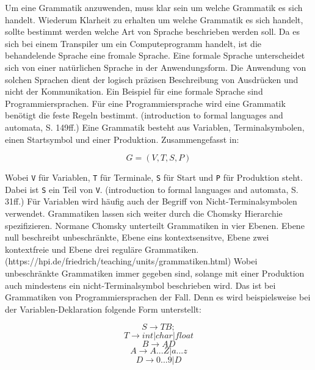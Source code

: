 Um eine Grammatik anzuwenden, muss klar sein um welche Grammatik es sich handelt. Wiederum Klarheit zu erhalten um welche Grammatik es sich handelt, sollte bestimmt werden welche Art von Sprache beschrieben werden soll. Da es sich bei einem Transpiler um ein Computeprogramm handelt, ist die behandelende Sprache eine fromale Sprache. Eine formale Sprache unterscheidet sich von einer natürlichen Sprache in der Anwendungsform. Die Anwendung von solchen Sprachen dient der logisch präzisen Beschreibung von Ausdrücken und nicht der Kommunikation. Ein Beispiel für eine formale Sprache sind Programmiersprachen. Für eine Programmiersprache wird eine Grammatik benötigt die feste Regeln bestimmt. (introduction to formal languages and automata, S. 149ff.) Eine Grammatik besteht aus Variablen, Terminalsymbolen, einen Startsymbol und einer Produktion. Zusammengefasst in:
\begin{center}
\begin{equation}
G=(V,T,S,P)
\end{equation}
\end{center}
Wobei \verb+V+ für Variablen, \verb+T+ für Terminale, \verb+S+ für Start und \verb+P+ für Produktion steht. Dabei ist \verb+S+ ein Teil von \verb+V+. (introduction to formal languages and automata, S. 31ff.) Für Variablen wird häufig auch der Begriff von Nicht-Terminalsymbolen verwendet.
Grammatiken lassen sich weiter durch die Chomsky Hierarchie spezifizieren. Normane Chomsky unterteilt Grammatiken in vier Ebenen. Ebene null beschreibt unbeschränkte, Ebene eins kontextsensitve, Ebene zwei kontextfreie und Ebene drei reguläre Grammatiken.(https://hpi.de/friedrich/teaching/units/grammatiken.html) 
\pagebreak
Wobei unbeschränkte Grammatiken immer gegeben sind, solange mit einer Produktion auch mindestens ein nicht-Terminalsymbol beschrieben wird. Das ist bei Grammatiken von Programmiersprachen der Fall. Denn es wird beispielsweise bei der Variablen-Deklaration folgende Form unterstellt:

\begin{center}
\begin{equation}
S \to TB;
\end{equation}
\begin{equation}
T \to int | char | float
\end{equation}
\begin{equation}
B \to AD
\end{equation}
\begin{equation}
A \to A...Z|a...z
\end{equation}
\begin{equation}
D \to 0...9|D
\end{equation}
\end{center}
 

